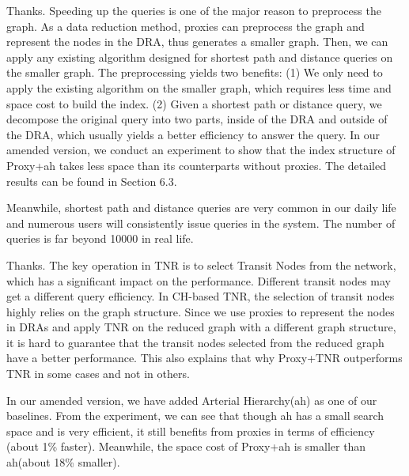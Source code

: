\documentclass[11pt]{letter}
\newcommand{\svs}{\vspace{0.36ex}}
\newcommand{\ah}{{\sc ah}\xspace}
\begin{document}
Thanks. Speeding up the queries is one of the major reason to preprocess the graph. As a data reduction method, proxies can preprocess the graph and represent the nodes in the DRA, thus generates a smaller graph. Then, we can apply any existing algorithm designed for shortest path and distance queries on the smaller graph. The preprocessing yields two benefits: (1) We only need to apply the existing algorithm on the smaller graph, which requires less time and space cost to build the index. (2) Given a shortest path or distance query, we decompose the original query into two parts, inside of the DRA and outside of the DRA, which usually yields a better efficiency to answer the query. In our amended version, we conduct an experiment to show that the index structure of Proxy+\ah takes less space than its counterparts without proxies. The detailed results can be found in Section 6.3.

Meanwhile, shortest path and distance queries are very common in our daily life and numerous users will consistently issue queries in the system. The number of queries is far beyond 10000 in real life.



\svs
Thanks. The key operation in TNR is to select Transit Nodes from the network, which has a significant impact on the performance. Different transit nodes may get a different query efficiency. In CH-based TNR, the selection of transit nodes highly relies on the graph structure. Since we use proxies to represent the nodes in DRAs and apply TNR on the reduced graph with a different graph structure, it is hard to guarantee that the transit nodes selected from the reduced graph have a better performance. This also explains that why Proxy+TNR outperforms TNR in some cases and not in others.

In our amended version, we have added Arterial Hierarchy(\ah) as one of our baselines. From the experiment, we can see that though \ah has a small search space and is very efficient, it still benefits from proxies in terms of efficiency (about 1\% faster). Meanwhile, the space cost of Proxy+\ah is smaller than \ah (about 18\% smaller).


\end{document}
